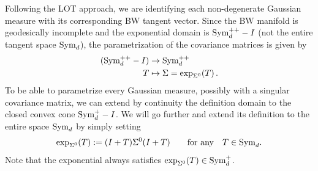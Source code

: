 \documentclass{article}
\theoremstyle{plain}
\theoremstyle{definition}
\theoremstyle{remark}
\newcommand{\R}{ \mathbb{R}}
\newcommand{\sym}{\textup{Sym}_d}
\newcommand{\pd}{\textup{Sym}^{++}_d}
\newcommand{\psd}{\textup{Sym}^{+}_d}
\newcommand{\tr}{\textup{tr}}
\begin{document}




Following the LOT approach, we are identifying each non-degenerate Gaussian measure with its corresponding BW tangent vector. Since the BW manifold is geodesically incomplete and the exponential domain is $\pd - I$ (not the entire tangent space $\sym$), the parametrization of the covariance matrices is given by
\begin{align*}
(\pd- I) &\to \pd \\
T & \mapsto \Sigma = \exp_{\Sigma^0}(T)\,.
\end{align*}
To be able to parametrize every Gaussian measure, possibly with a singular covariance matrix, we can extend by continuity the definition domain to the closed convex cone $\psd - I$. We will go further and extend its definition to the entire space $\sym$ by simply setting 
\[
\exp_{\Sigma^0}(T):=(I +T)\Sigma^0 (I + T)\qquad \textup{for any} \quad T \in \sym.
\]
Note that the exponential always satisfies $\exp_{\Sigma^0}(T)\in \psd$.  
\end{document}
